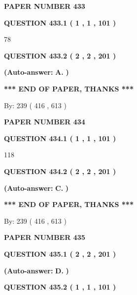 \documentclass{ctexart}
\begin{document}
   
 {\textbf{ \Large{ PAPER NUMBER  433  }}}
   
   
   
   
  
  
{\textbf{\large{QUESTION
433.1 
 ( 1 , 1 , 101 )
}}}

78
  
  
{\textbf{\large{QUESTION
433.2 
 ( 2 , 2 , 201 )
}}}
 
 
{\textbf{(Auto-answer:}}
{\textbf{\large{
A.}}}
{\textbf{)}}
 
 
   
   
   
   
\vspace{1.0in} 
{\textbf{\large{ *** END OF PAPER, THANKS *** }}} 
   
   
\hspace{1.0in} By: 
 239 ( 416 ,  613 )
   
   
   
   
\newpage 
\setcounter{page}{ 
   434001 } 
   
   
 {\textbf{ \Large{ PAPER NUMBER  434  }}}
   
   
   
   
  
  
{\textbf{\large{QUESTION
434.1 
 ( 1 , 1 , 101 )
}}}

118
  
  
{\textbf{\large{QUESTION
434.2 
 ( 2 , 2 , 201 )
}}}
 
 
{\textbf{(Auto-answer:}}
{\textbf{\large{
C.}}}
{\textbf{)}}
 
 
   
   
   
   
\vspace{1.0in} 
{\textbf{\large{ *** END OF PAPER, THANKS *** }}} 
   
   
\hspace{1.0in} By: 
 239 ( 416 ,  613 )
   
   
   
   
\newpage 
\setcounter{page}{ 
   435001 } 
   
   
 {\textbf{ \Large{ PAPER NUMBER  435  }}}
   
   
   
   
  
  
{\textbf{\large{QUESTION
435.1 
 ( 2 , 2 , 201 )
}}}
 
 
{\textbf{(Auto-answer:}}
{\textbf{\large{
D.}}}
{\textbf{)}}
 
 
  
  
{\textbf{\large{QUESTION
435.2 
 ( 1 , 1 , 101 )
}}}
\end{document}
